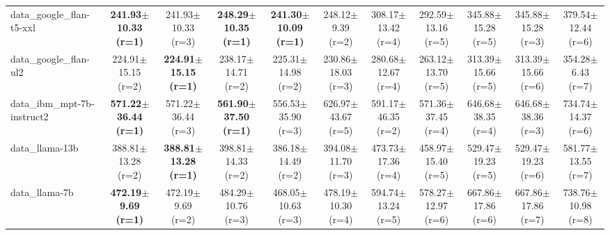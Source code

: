 \begin{table}[t]
\begin{tabular}{lcccccccccc}
data\_google\_flan-t5-xxl & \cellcolor{red!15}\textbf{241.93$\pm$10.33 {\scriptsize (r=1)}} & 241.93$\pm$10.33 {\scriptsize (r=3)} & \cellcolor{red!15}\textbf{248.29$\pm$10.35 {\scriptsize (r=1)}} & \cellcolor{red!15}\textbf{241.30$\pm$10.09 {\scriptsize (r=1)}} & 248.12$\pm$9.39 {\scriptsize (r=2)} & 308.17$\pm$13.42 {\scriptsize (r=4)} & 292.59$\pm$13.16 {\scriptsize (r=5)} & 345.88$\pm$15.28 {\scriptsize (r=5)} & 345.88$\pm$15.28 {\scriptsize (r=3)} & 379.54$\pm$12.44 {\scriptsize (r=6)} \\
data\_google\_flan-ul2 & 224.91$\pm$15.15 {\scriptsize (r=2)} & \cellcolor{red!15}\textbf{224.91$\pm$15.15 {\scriptsize (r=1)}} & 238.17$\pm$14.71 {\scriptsize (r=2)} & 225.31$\pm$14.98 {\scriptsize (r=2)} & 230.86$\pm$18.03 {\scriptsize (r=3)} & 280.68$\pm$12.67 {\scriptsize (r=4)} & 263.12$\pm$13.70 {\scriptsize (r=5)} & 313.39$\pm$15.66 {\scriptsize (r=5)} & 313.39$\pm$15.66 {\scriptsize (r=6)} & 354.28$\pm$6.43 {\scriptsize (r=7)} \\
data\_ibm\_mpt-7b-instruct2 & \cellcolor{red!15}\textbf{571.22$\pm$36.44 {\scriptsize (r=1)}} & 571.22$\pm$36.44 {\scriptsize (r=3)} & \cellcolor{red!15}\textbf{561.90$\pm$37.50 {\scriptsize (r=1)}} & 556.53$\pm$35.90 {\scriptsize (r=3)} & 626.97$\pm$43.67 {\scriptsize (r=5)} & 591.17$\pm$46.35 {\scriptsize (r=2)} & 571.36$\pm$37.45 {\scriptsize (r=4)} & 646.68$\pm$38.35 {\scriptsize (r=4)} & 646.68$\pm$38.36 {\scriptsize (r=3)} & 734.74$\pm$14.37 {\scriptsize (r=6)} \\
data\_llama-13b & 388.81$\pm$13.28 {\scriptsize (r=2)} & \cellcolor{red!15}\textbf{388.81$\pm$13.28 {\scriptsize (r=1)}} & 398.81$\pm$14.33 {\scriptsize (r=2)} & 386.18$\pm$14.49 {\scriptsize (r=2)} & 394.08$\pm$11.70 {\scriptsize (r=3)} & 473.73$\pm$17.36 {\scriptsize (r=4)} & 458.97$\pm$15.40 {\scriptsize (r=5)} & 529.47$\pm$19.23 {\scriptsize (r=5)} & 529.47$\pm$19.23 {\scriptsize (r=6)} & 581.77$\pm$13.55 {\scriptsize (r=7)} \\
data\_llama-7b & \cellcolor{red!15}\textbf{472.19$\pm$9.69 {\scriptsize (r=1)}} & 472.19$\pm$9.69 {\scriptsize (r=2)} & 484.29$\pm$10.76 {\scriptsize (r=3)} & 468.05$\pm$10.63 {\scriptsize (r=3)} & 478.19$\pm$10.30 {\scriptsize (r=4)} & 594.74$\pm$13.24 {\scriptsize (r=5)} & 578.27$\pm$12.97 {\scriptsize (r=6)} & 667.86$\pm$17.86 {\scriptsize (r=6)} & 667.86$\pm$17.86 {\scriptsize (r=7)} & 738.76$\pm$10.98 {\scriptsize (r=8)} \\
\bottomrule
\end{tabular}
\end{table}